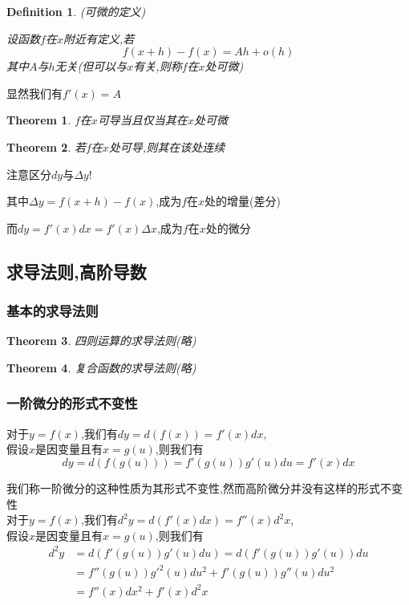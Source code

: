 \documentclass[11pt,hyperref,a4paper,UTF8]{ctexart}
\newtheorem{theorem}{Theorem}[subsection]
\newtheorem{definition}{Definition}[subsection]
\begin{document}
\begin{CJK}{UTF8}{gkai}
\begin{definition}
(可微的定义)

设函数$f$在$x$附近有定义,若
\[f(x + h) - f(x) = Ah + o(h)\]
其中$A$与$h$无关(但可以与$x$有关,则称$f$在$x$处可微)
\end{definition}

显然我们有$f'(x) = A$

\begin{theorem}
  $f$在$x$可导当且仅当其在$x$处可微
\end{theorem}

\begin{theorem}
  若$f$在$x$处可导,则其在该处连续
\end{theorem}

注意区分$dy$与$\Delta y$!

其中$\Delta y = f(x + h) - f(x)$,成为$f$在$x$处的增量(差分)

而$dy = f'(x) dx = f'(x) \Delta x$,成为$f$在$x$处的微分
\subsection{求导法则,高阶导数}
\subsubsection{基本的求导法则}
\begin{theorem}
  四则运算的求导法则(略)
\end{theorem}

\begin{theorem}
  复合函数的求导法则(略)
\end{theorem}

\subsubsection{一阶微分的形式不变性}
对于$y=f(x)$,我们有$dy = d(f(x)) = f'(x) dx$,\\
假设$x$是因变量且有$x=g(u)$,则我们有
\[dy = d(f(g(u))) = f'(g(u)) g'(u)du = f'(x) dx\]

我们称一阶微分的这种性质为其形式不变性,然而高阶微分并没有这样的形式不变性\\
对于$y=f(x)$,我们有$d^2y = d(f'(x) dx) = f''(x) d^2x$,\\
假设$x$是因变量且有$x=g(u)$,则我们有
\[
\begin{aligned}    
d^2y &= d(f'(g(u)) g'(u)du) = d(f'(g(u)) g'(u))du \\
&= f''(g(u))g'^2(u) du^2 + f'(g(u)) g''(u) du^2 \\
&= f''(x) dx^2 + f'(x) d^2 x\\
\end{aligned}
\]


\end{CJK}
\end{document}
